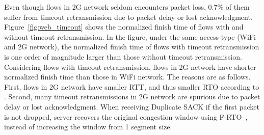 Even though flows in 2G network seldom encounters packet loss, 0.7\% of them suffer from timeout retransmission due to packet delay or lost acknowledgment. Figure~\ref{fig:web_timeout} shows the normalized finish time of flows with and without timeout retransmission. In the figure, under the same access type (WiFi and 2G network), the normalized finish time of flows with timeout retransmission is one order of magnitude larger than those without timeout retransmission. Considering flows with timeout retransmission, flows in 2G network have shorter normalized finish time than those in WiFi network. The reasons are as follows. First, flows in 2G network have smaller RTT, and thus smaller RTO according to \cite{rfc62982011computing}. Second, many timeout retransmissions in 2G network are spurious due to packet delay or lost acknowledgment. When receiving Duplicate SACK if the first packet is not dropped, server recovers the original congestion window using F-RTO~\cite{sarolahti2005forward}, instead of increasing the window from 1 segment size.


